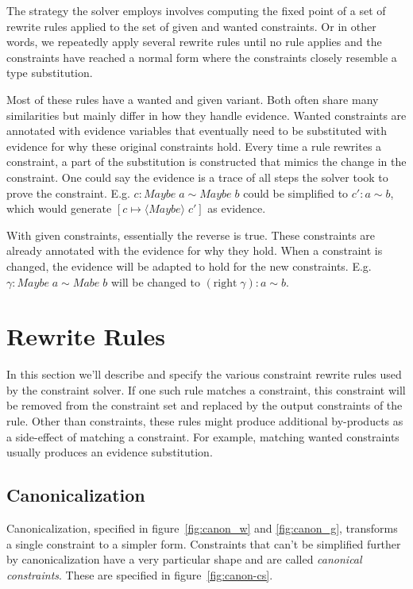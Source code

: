 The strategy the solver employs involves computing the fixed point of a set of
rewrite rules applied to the set of given and wanted constraints. Or in other
words, we repeatedly apply several rewrite rules until no rule applies and the
constraints have reached a normal form where the constraints closely resemble a
type substitution.

Most of these rules have a wanted and given variant. Both often share many
similarities but mainly differ in how they handle evidence. Wanted constraints
are annotated with evidence variables that eventually need to be substituted
with evidence for why these original constraints hold. Every time a rule
rewrites a constraint, a part of the substitution is constructed that mimics the
change in the constraint. One could say the evidence is a trace of all steps the
solver took to prove the constraint. E.g. $c : Maybe \; a \sim Maybe \; b$ could
be simplified to $c': a \sim b$, which would generate $[c \mapsto \langle Maybe
\rangle \; c']$ as evidence. %

With given constraints, essentially the reverse is true. These constraints are
already annotated with the evidence for why they hold. When a constraint is
changed, the evidence will be adapted to hold for the new constraints. E.g.
$\gamma : Maybe \; a \sim Mabe \; b$ will be changed to $(\text{right}\; \gamma) :
a \sim b$.

\section{Rewrite Rules}
In this section we'll describe and specify the various constraint rewrite rules
used by the constraint solver. If one such rule matches a constraint, this
constraint will be removed from the constraint set and replaced by the output
constraints of the rule. Other than constraints, these rules might produce
additional by-products as a side-effect of matching a constraint. For example,
matching wanted constraints usually produces an evidence substitution.


\subsection{Canonicalization}

Canonicalization, specified in figure~\ref{fig:canon_w} and \ref{fig:canon_g},
transforms a single constraint to a simpler form. Constraints that can't be
simplified further by canonicalization have a very particular shape and are
called \textit{canonical constraints}. These are specified in
figure~\ref{fig:canon-cs}.

